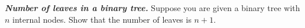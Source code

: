 {\large\bfseries\itshape Number of leaves in a binary tree.} 
Suppose you are given a binary tree with $n$ internal nodes.  Show
that the number of leaves is $n+1$. 
